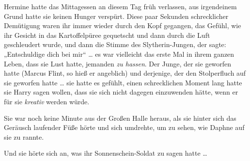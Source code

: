 Hermine hatte das Mittagessen an diesem Tag früh verlassen, aus irgendeinem Grund hatte sie keinen Hunger verspürt. Diese paar Sekunden schrecklicher Demütigung waren ihr immer wieder durch den Kopf gegangen, das Gefühl, wie ihr Gesicht in das Kartoffelpüree gequetscht und dann durch die Luft geschleudert wurde, und dann die Stimme des Slytherin-Jungen, der sagte:
„Entschuldige dich bei mir“ … es war vielleicht das erste Mal in ihrem ganzen Leben, dass sie Lust hatte, jemanden \emph{zu hassen}. Der Junge, der sie geworfen hatte (Marcus Flint, so hieß er angeblich) und derjenige, der den Stolperfluch auf sie geworfen hatte … sie hatte es gefühlt, einen schrecklichen Moment lang hatte sie Harry sagen wollen, dass sie sich nicht dagegen einzuwenden hätte, wenn er für sie \emph{kreativ} werden würde.

Sie war noch keine Minute aus der Großen Halle heraus, als sie hinter sich das Geräusch laufender Füße hörte und sich umdrehte, um zu sehen, wie Daphne auf sie zu rannte.

Und sie hörte sich an, was ihr Sonnenschein-Soldat zu sagen hatte …

